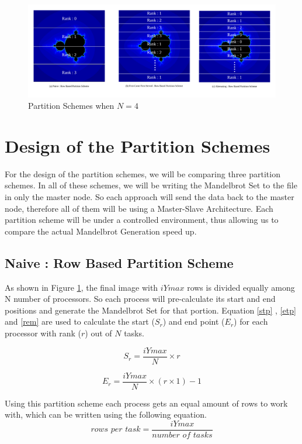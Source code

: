 \documentclass[conference]{IEEEtran}
\begin{document}
	\begin{figure}[t!]
	\centering
	\includegraphics[width=7in]{P_SCHEME2} 
	\caption{Partition Schemes when $N=4$ }
	\label{Partition}
\end{figure}
			
	\section{Design of the Partition Schemes}
	For the design of the partition schemes, we will be comparing three partition schemes. In all of these schemes, we will be writing the Mandelbrot Set to the file in only the master node. So each approach will send the data back to the master node, therefore all of them will be using a Master-Slave Architecture. Each partition scheme will be under a controlled environment, thus allowing us to compare the actual Mandelbrot Generation speed up.

			\subsection{Naive : Row Based Partition Scheme }\label{Naive}
			As shown in Figure \ref{Partition}, the final image with $iYmax$ rows is divided equally among N number of processors. So each process will pre-calculate its start and end positions and generate the Mandelbrot Set for that portion. Equation \ref{stp} , \ref{etp} and \ref{rem} are used to calculate the start ($S_r$) and end point ($E_r$)  for each processor with rank ($r$) out of $N$ tasks.
			
			\begin{equation}
			S_r = \frac{iYmax}{N} \times r
			\label{stp}
			\end{equation}
			
			\begin{equation}
			E_r = \frac{iYmax}{N} \times (r \times 1 ) - 1
			\label{etp}
			\end{equation}
			
			Using this partition scheme each process gets an equal amount of rows to work with, which can be written using the following equation.
			\begin{equation}
				\label{rowsPerTask}
				\textit{rows per task} = \frac{iYmax}{\textit{number of tasks}}
			\end{equation}
			
\end{document}
